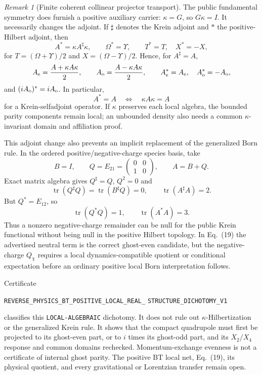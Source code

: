\documentclass[11pt]{article}
\theoremstyle{definition}
\theoremstyle{remark}
\newtheorem{remark}[theorem]{Remark}
\begin{document}
\begin{remark}[Finite coherent collinear projector transport]
The public fundamental symmetry does furnish a positive auxiliary carrier:
$\kappa=G$, so $G\kappa=I$.  It necessarily changes the adjoint.  If
$\sharp$ denotes the Krein adjoint and $*$ the positive-Hilbert adjoint, then
\[
 A^*=\kappa A^\sharp\kappa,
 \qquad \Omega^*=\Upsilon,
 \qquad T^*=T,\quad X^*=-X,
\]
for $T=(\Omega+\Upsilon)/2$ and $X=(\Omega-\Upsilon)/2$.  Hence, for
$A^\sharp=A$,
\[
 A_{\rm e}={A+\kappa A\kappa\over2},\qquad
 A_{\rm o}={A-\kappa A\kappa\over2},
 \qquad
 A_{\rm e}^*=A_{\rm e},\quad A_{\rm o}^*=-A_{\rm o},
\]
and $(iA_{\rm o})^*=iA_{\rm o}$.  In particular,
\[
 \boxed{A^*=A\quad\Longleftrightarrow\quad\kappa A\kappa=A}
\]
for a Krein-selfadjoint operator.  If $\kappa$ preserves each local algebra,
the bounded parity components remain local; an unbounded density also needs
a common $\kappa$-invariant domain and affiliation proof.

This adjoint change also prevents an implicit replacement of the generalized
Born rule.  In the ordered positive/negative-charge species basis, take
\[
 B=I,\qquad Q=E_{21}=\begin{pmatrix}0&0\\1&0\end{pmatrix},
 \qquad A=B+Q.
\]
Exact matrix algebra gives $Q^\sharp=Q$, $Q^2=0$ and
\[
 \operatorname{tr}(Q^\sharp Q)
 =\operatorname{tr}(B^\sharp Q)=0,
 \qquad \operatorname{tr}(A^\sharp A)=2.
\]
But $Q^*=E_{12}$, so
\[
 \operatorname{tr}(Q^*Q)=1,
 \qquad \operatorname{tr}(A^*A)=3.
\]
Thus a nonzero negative-charge remainder can be null for the public Krein
functional without being null in the positive Hilbert topology.  In
Eq.~(19) the advertised neutral term is the correct ghost-even candidate,
but the negative-charge $Q_\chi$ requires a local dynamics-compatible
quotient or conditional expectation before an ordinary positive local Born
interpretation follows.

Certificate
\par\noindent
\texttt{REVERSE\_PHYSICS\_BT\_POSITIVE\_LOCAL\_REAL\_}
\allowbreak\texttt{STRUCTURE\_DICHOTOMY\_V1}
\par\noindent
classifies this \texttt{LOCAL-ALGEBRAIC} dichotomy.  It does not rule out
$\kappa$-Hilbertization or the generalized Krein rule.  It shows that the
compact quadrupole must first be projected to its ghost-even part, or to
$i$ times its ghost-odd part, and its $X_2/X_4$ response and common domains
rechecked.  Momentum-exchange evenness is not a certificate of internal
ghost parity.  The positive BT local net, Eq.~(19), its physical quotient,
and every gravitational or Lorentzian transfer remain open.


\end{remark}
\end{document}
